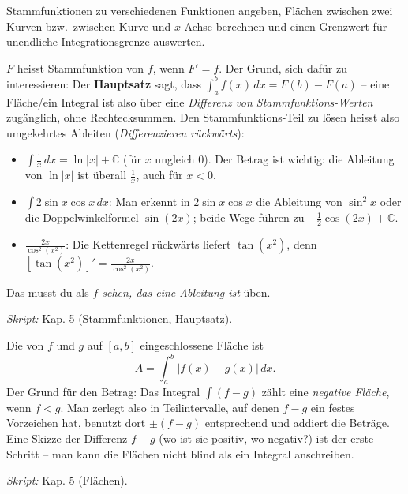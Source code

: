 

Stammfunktionen zu verschiedenen Funktionen angeben, Flächen zwischen zwei
Kurven bzw.\ zwischen Kurve und $x$-Achse berechnen und einen Grenzwert
für unendliche Integrationsgrenze auswerten.

\begin{werkzeugkasten}
$F$ heisst Stammfunktion von $f$, wenn $F'=f$. Der Grund, sich dafür zu
interessieren: Der \textbf{Hauptsatz} sagt, dass
$\int_a^b f(x)\,dx=F(b)-F(a)$ -- eine Fläche/ein Integral ist also über
eine \emph{Differenz von Stammfunktions-Werten} zugänglich, ohne
Rechtecksummen. Den Stammfunktions-Teil zu lösen heisst also umgekehrtes
Ableiten (\emph{Differenzieren rückwärts}):
\begin{itemize}
  \item $\displaystyle\int\frac1x\,dx=\ln|x|+\mathbb C$ (für $x$ ungleich
        $0$). Der Betrag ist wichtig: die Ableitung von $\ln|x|$ ist
        überall $\frac1x$, auch für $x<0$.
  \item $\displaystyle\int 2\sin x\cos x\,dx$: Man erkennt in $2\sin x\cos x$
        die Ableitung von $\sin^2x$ oder die Doppelwinkelformel
        $\sin(2x)$; beide Wege führen zu $-\frac12\cos(2x)+\mathbb C$.
  \item $\displaystyle\frac{2x}{\cos^2(x^2)}$: Die Kettenregel rückwärts
        liefert $\tan(x^2)$, denn $[\tan(x^2)]'=\frac{2x}{\cos^2(x^2)}$.
\end{itemize}
Das musst du als \emph{$f$ sehen, das eine Ableitung ist} üben.

\textit{Skript:} Kap. 5 (Stammfunktionen, Hauptsatz).
\end{werkzeugkasten}

\begin{werkzeugkasten}
Die von $f$ und $g$ auf $[a,b]$ eingeschlossene Fläche ist
\begin{equation*}
  A=\int_a^b |f(x)-g(x)|\,dx .
\end{equation*}
Der Grund für den Betrag: Das Integral $\int(f-g)$ zählt eine \emph{negative
Fläche}, wenn $f<g$. Man zerlegt also in Teilintervalle, auf denen $f-g$
ein festes Vorzeichen hat, benutzt dort $\pm(f-g)$ entsprechend und addiert
die Beträge. Eine Skizze der Differenz $f-g$ (wo ist sie positiv, wo
negativ?) ist der erste Schritt -- man kann die Flächen nicht blind als ein
Integral anschreiben.

\textit{Skript:} Kap. 5 (Flächen).
\end{werkzeugkasten}

